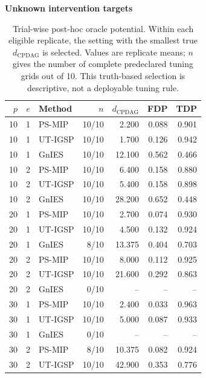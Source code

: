 \begin{table}[t]
    \centering
    \caption{Trial-wise post-hoc oracle potential. Within each eligible replicate, the setting with the smallest true $d_{\mathrm{CPDAG}}$ is selected. Values are replicate means; $n$ gives the number of complete predeclared tuning grids out of 10. This truth-based selection is descriptive, not a deployable tuning rule.}
    \label{tab:synthetic-best-dcpdag}
    \begingroup
    \scriptsize
    \setlength{\tabcolsep}{2.3pt}
    \renewcommand{\arraystretch}{1.03}
    \begin{minipage}[t]{0.49\textwidth}
    \centering
    \textbf{Unknown intervention targets}\\[2pt]
    \begin{tabular}{rrlrrrr}
        \hline
        $p$ & $e$ & Method & $n$ & $d_{\mathrm{CPDAG}}$ & FDP & TDP \\
        \hline
        10 & 1 & PS-MIP & 10/10 & 2.200 & 0.088 & 0.901 \\
        10 & 1 & UT-IGSP & 10/10 & 1.700 & 0.126 & 0.942 \\
        10 & 1 & GnIES & 10/10 & 12.100 & 0.562 & 0.466 \\
        10 & 2 & PS-MIP & 10/10 & 6.400 & 0.158 & 0.880 \\
        10 & 2 & UT-IGSP & 10/10 & 5.400 & 0.158 & 0.898 \\
        10 & 2 & GnIES & 10/10 & 28.200 & 0.652 & 0.448 \\
        20 & 1 & PS-MIP & 10/10 & 2.700 & 0.074 & 0.930 \\
        20 & 1 & UT-IGSP & 10/10 & 4.500 & 0.132 & 0.924 \\
        20 & 1 & GnIES & 8/10 & 13.375 & 0.404 & 0.703 \\
        20 & 2 & PS-MIP & 10/10 & 8.000 & 0.112 & 0.925 \\
        20 & 2 & UT-IGSP & 10/10 & 21.600 & 0.292 & 0.863 \\
        20 & 2 & GnIES & 0/10 & -- & -- & -- \\
        30 & 1 & PS-MIP & 10/10 & 2.400 & 0.033 & 0.963 \\
        30 & 1 & UT-IGSP & 10/10 & 5.000 & 0.087 & 0.933 \\
        30 & 1 & GnIES & 0/10 & -- & -- & -- \\
        30 & 2 & PS-MIP & 8/10 & 10.375 & 0.082 & 0.924 \\
        30 & 2 & UT-IGSP & 10/10 & 42.900 & 0.353 & 0.776 \\

\end{tabular}
\end{minipage}
\end{table}
